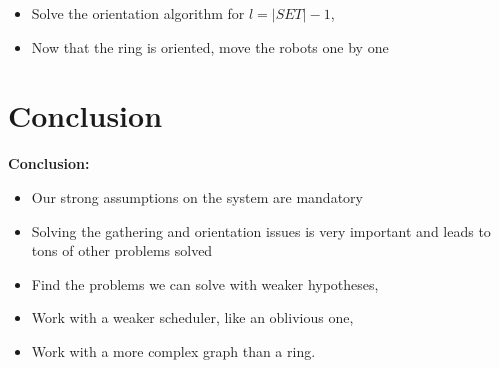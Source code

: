 \documentclass{beamer}
\begin{document}
\begin{frame}
	\begin{itemize}
		\item<1-> Solve the orientation algorithm for $l = |SET| - 1$,
		\item<2-> Now that the ring is oriented, move the robots one by one
	\end{itemize}
	
\end{frame}


\section{Conclusion}
\begin{frame}
	\textbf{Conclusion:}
	\begin{itemize}
		\item<2-> Our strong assumptions on the system are mandatory
		\item<3-> Solving the gathering and orientation issues is very important and leads to tons of other problems solved
	\end{itemize}
	
	\begin{itemize}
		\item<5-> Find the problems we can solve with weaker hypotheses,
		\item<6-> Work with a weaker scheduler, like an oblivious one,
		\item<7-> Work with a more complex graph than a ring.
	\end{itemize}
	
\end{frame}
\end{document}
